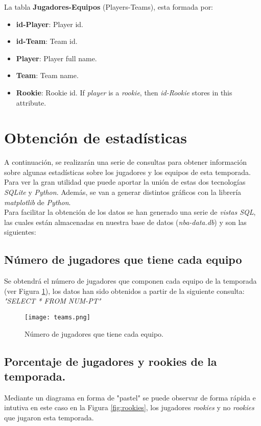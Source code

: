 \documentclass[11pt]{diazessay} %
\begin{document}
La tabla \textbf{Jugadores-Equipos} (Players-Teams), esta formada por:
\begin{itemize}
	\item\textbf{id-Player}: Player id.
	\item\textbf{id-Team}: Team id.
	\item\textbf{Player}: Player full name.
	\item\textbf{Team}: Team name.
	\item\textbf{Rookie}: Rookie id. If \textit{player} is a \textit{rookie}, then \textit{id-Rookie} stores in this attribute.
\end{itemize}

\clearpage

\section*{Obtención de estadísticas}
A continuación, se realizarán una serie de consultas para obtener información sobre algunas estadísticas sobre los jugadores y los equipos de esta temporada. Para ver la gran utilidad que puede aportar la unión de estas dos tecnologías \textit{SQLite} \cite{sqlite} y \textit{Python}. Además, se van a generar distintos gráficos con la librería \textit{matplotlib} \cite{matplotlib} de \textit{Python}. \\

Para facilitar la obtención de los datos se han generado una serie de \textit{vistas SQL}, las cuales están almacenadas en nuestra base de datos (\textit{nba-data.db}) y son las siguientes:

\newpage
\subsection*{Número de jugadores que tiene cada equipo}
Se obtendrá el número de jugadores que componen cada equipo de la temporada (ver Figura \ref{fig:playersteams}), los datos han sido obtenidos a partir de la siguiente consulta:\\

\textit{"SELECT * FROM NUM-PT"}

\begin{figure}[!h]
	\centering
	\texttt{[image: teams.png]}
	\caption{Número de jugadores que tiene cada equipo.}
	\label{fig:playersteams}
\end{figure}



\subsection*{Porcentaje de jugadores y rookies de la temporada.}
Mediante un diagrama en forma de "pastel" se puede observar de forma rápida e intutiva en este caso en la Figura \ref{fig:rookies}, los jugadores \textit{rookies} y no \textit{rookies} que jugaron esta temporada.\\
\end{document}
